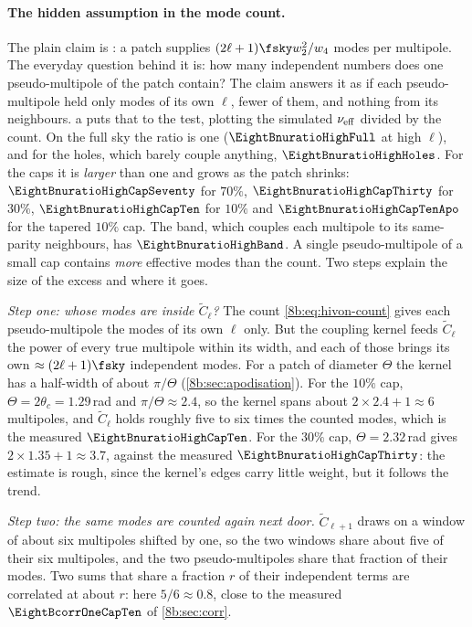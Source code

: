\paragraph{The hidden assumption in the mode count.}
The plain claim is : a patch supplies $(2\ell+1)\fsky w_2^2/w_4$ modes per multipole.
The everyday question behind it is: how many independent numbers does one pseudo-multipole of the
patch contain? The claim answers it as if each pseudo-multipole held only modes of its own $\ell$,
fewer of them, and nothing from its neighbours. a puts that to the test, plotting
the simulated $\nu_{\rm eff}$ divided by the count. On the full sky the ratio is one
($\EightBnuratioHighFull$ at high $\ell$), and for the holes, which barely couple anything,
$\EightBnuratioHighHoles$. For the caps it is \emph{larger} than one and grows as the patch shrinks:
$\EightBnuratioHighCapSeventy$ for $70\%$, $\EightBnuratioHighCapThirty$ for $30\%$, $\EightBnuratioHighCapTen$ for $10\%$ and
$\EightBnuratioHighCapTenApo$ for the tapered $10\%$ cap. The band, which couples each multipole to its
same-parity neighbours, has $\EightBnuratioHighBand$. A single pseudo-multipole of a small cap contains
\emph{more} effective modes than the count. Two steps explain the size of the excess and where it goes.

\emph{Step one: whose modes are inside $\widetilde C_\ell$?} The count \eqref{8b:eq:hivon-count} gives each
pseudo-multipole the modes of its own $\ell$ only. But the coupling kernel feeds $\widetilde C_\ell$ the power of every
true multipole within its width, and each of those brings its own $\approx(2\ell+1)\fsky$ independent modes.
For a patch of diameter $\Theta$ the kernel has a half-width of about $\pi/\Theta$ (\cref{8b:sec:apodisation}).
For the $10\%$ cap, $\Theta=2\theta_c=1.29$\,rad and $\pi/\Theta\approx2.4$, so the kernel spans about
$2\times2.4+1\approx6$ multipoles, and $\widetilde C_\ell$ holds roughly five to six times the counted modes, which is
the measured $\EightBnuratioHighCapTen$. For the $30\%$ cap, $\Theta=2.32$\,rad gives $2\times1.35+1\approx3.7$, against
the measured $\EightBnuratioHighCapThirty$: the estimate is rough, since the kernel's edges carry little weight,
but it follows the trend.

\emph{Step two: the same modes are counted again next door.} $\widetilde C_{\ell+1}$ draws on a window of
about six multipoles shifted by one, so the two windows share about five of their six multipoles, and
the two pseudo-multipoles share that fraction of their modes. Two sums that share a fraction $r$ of
their independent terms are correlated at about $r$: here $5/6\approx0.8$, close to the measured
$\EightBcorrOneCapTen$ of \cref{8b:sec:corr}.

